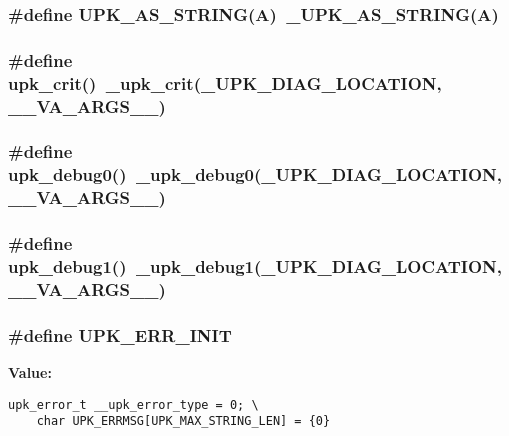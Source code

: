 \subsubsection{\setlength{\rightskip}{0pt plus 5cm}\#define UPK\_\-AS\_\-STRING(A)~\_\-UPK\_\-AS\_\-STRING(A)}\label{group__upk__errors_gf8f9dbb4ea4f7e0502ee72b1139abf51}


\subsubsection{\setlength{\rightskip}{0pt plus 5cm}\#define upk\_\-crit()~\_\-upk\_\-crit(\_\-UPK\_\-DIAG\_\-LOCATION, \_\-\_\-VA\_\-ARGS\_\-\_\-)}\label{group__upk__errors_gff686c96124df5c06b257fae2815f93e}


\subsubsection{\setlength{\rightskip}{0pt plus 5cm}\#define upk\_\-debug0()~\_\-upk\_\-debug0(\_\-UPK\_\-DIAG\_\-LOCATION, \_\-\_\-VA\_\-ARGS\_\-\_\-)}\label{group__upk__errors_g329df910624f74edd6fe6a9cebc5e673}


\subsubsection{\setlength{\rightskip}{0pt plus 5cm}\#define upk\_\-debug1()~\_\-upk\_\-debug1(\_\-UPK\_\-DIAG\_\-LOCATION, \_\-\_\-VA\_\-ARGS\_\-\_\-)}\label{group__upk__errors_gca4df3ff9f9219ee65c24620e577c09f}


\subsubsection{\setlength{\rightskip}{0pt plus 5cm}\#define UPK\_\-ERR\_\-INIT}\label{group__upk__errors_gdb48610aba8e7636871ab2f7494bbab0}


\textbf{Value:}

\begin{Code}\begin{verbatim}upk_error_t __upk_error_type = 0; \
    char UPK_ERRMSG[UPK_MAX_STRING_LEN] = {0}
\end{verbatim}\end{Code}
